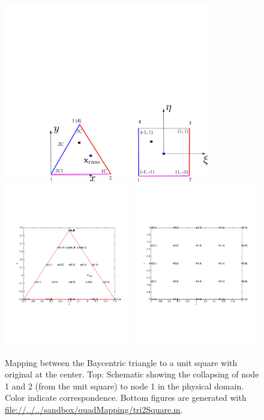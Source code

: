 \documentclass[paper = letter, fontsize = 11pt]{scrartcl} %
\begin{document}
\begin{figure}[!h]
  \centering
  \includegraphics[width=0.8\textwidth]{quad2tri-mapping.pdf} \\
  \includegraphics[width=0.49\textwidth]{physical.pdf}
  \includegraphics[width=0.49\textwidth]{mapped.pdf}
  \caption{Mapping between the Baycentric triangle to a unit square with original at the center. Top: Schematic showing the
    collapsing of node 1 and 2 (from the unit square) to node 1 in the physical domain. Color
    indicate correspondence. Bottom
    figures  are generated
    with \url{file://../../sandbox/quadMapping/tri2Square.m}.}
  \label{fig:phy-map}
\end{figure}
\end{document}
